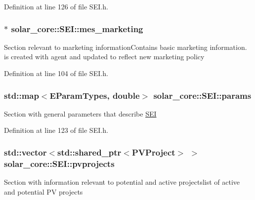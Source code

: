 Definition at line 126 of file S\+E\+I.\+h.

\hypertarget{classsolar__core_1_1_s_e_i_a2092c19659e7acd194ac326ba6fbdc29}{}
\subsubsection[{mes\+\_\+marketing}]{$\ast$ solar\+\_\+core\+::\+S\+E\+I\+::mes\+\_\+marketing\hspace{0.3cm}{\ttfamily [protected]}}\label{classsolar__core_1_1_s_e_i_a2092c19659e7acd194ac326ba6fbdc29}
Section relevant to marketing information\+Contains basic marketing information. is created with agent and updated to reflect new marketing policy 

Definition at line 104 of file S\+E\+I.\+h.

\hypertarget{classsolar__core_1_1_s_e_i_a811b998092171224983f9aefaa974707}{}
\subsubsection[{params}]{\setlength{\rightskip}{0pt plus 5cm}std\+::map$<${\bf E\+Param\+Types}, double$>$ solar\+\_\+core\+::\+S\+E\+I\+::params\hspace{0.3cm}{\ttfamily [protected]}}\label{classsolar__core_1_1_s_e_i_a811b998092171224983f9aefaa974707}
Section with general parameters that describe \hyperlink{classsolar__core_1_1_s_e_i}{S\+E\+I} 

Definition at line 123 of file S\+E\+I.\+h.

\hypertarget{classsolar__core_1_1_s_e_i_a76d9d151e51465d534ff0fd3d64f98bc}{}
\subsubsection[{pvprojects}]{\setlength{\rightskip}{0pt plus 5cm}std\+::vector$<$std\+::shared\+\_\+ptr$<${\bf P\+V\+Project}$>$ $>$ solar\+\_\+core\+::\+S\+E\+I\+::pvprojects\hspace{0.3cm}{\ttfamily [protected]}}\label{classsolar__core_1_1_s_e_i_a76d9d151e51465d534ff0fd3d64f98bc}
Section with information relevant to potential and active projectslist of active and potential P\+V projects 


